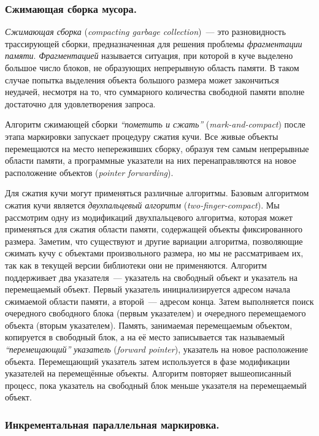 \subsubsection{Сжимающая сборка мусора.}
\label{sec:two-finger-compact}

\emph{Сжимающая сборка} (\emph{compacting garbage collection})~--- это разновидность 
трассирующей сборки, предназначенная для решения проблемы \emph{фрагментации памяти}. 
\emph{Фрагментацией} называется ситуация, при которой в куче выделено большое число блоков, 
не образующих непрерывную область памяти. 
В таком случае попытка выделения объекта большого размера может закончиться неудачей, 
несмотря на то, что суммарного количества свободной памяти вполне достаточно для 
удовлетворения запроса. 

Алгоритм сжимающей сборки \emph{``пометить и сжать''} (\emph{mark-and-compact}) 
после этапа маркировки запускает процедуру сжатия кучи. 
Все живые объекты перемещаются на место непереживших сборку, образуя тем самым непрерывные 
области памяти, а программные указатели на них перенаправляются на новое 
расположение объектов (\emph{pointer forwarding}). 

Для сжатия кучи могут применяться различные алгоритмы. 
Базовым алгоритмом сжатия кучи является \emph{двухпальцевый алгоритм} 
(\emph{two-finger-compact}). 
Мы рассмотрим одну из модификаций двухпальцевого алгоритма, которая может применяться 
для сжатия области памяти, содержащей объекты фиксированного размера. 
Заметим, что существуют и другие вариации алгоритма, позволяющие сжимать кучу с объектами 
произвольного размера, но мы не рассматриваем их, так как в текущей версии библиотеки они 
не применяются. 
Алгоритм поддерживает два указателя~--- указатель на свободный объект и 
указатель на перемещаемый объект. 
Первый указатель инициализируется адресом начала сжимаемой области памяти, 
а второй~--- адресом конца. 
Затем выполняется поиск очередного свободного блока (первым указателем) и 
очередного перемещаемого объекта (вторым указателем). 
Память, занимаемая перемещаемым объектом, копируется в свободный блок, 
а на её место записывается так называемый \emph{``перемещающий'' указатель} 
(\emph{forward pointer}), указатель на новое расположение объекта. 
Перемещающий указатель затем используется в фазе модификации указателей на 
перемещённые объекты. 
Алгоритм повторяет вышеописанный процесс, пока указатель на свободный блок 
меньше указателя на перемещаемый объект. 


\subsubsection{Инкрементальная параллельная маркировка.}
\label{sec:inc_marking}

